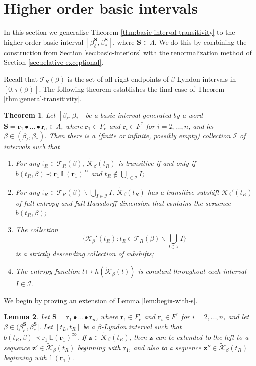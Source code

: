 \documentclass[11pt]{amsart}
\newtheorem{theorem}{Theorem}[section]
\newtheorem{lemma}[theorem]{Lemma}
\theoremstyle{definition}
\theoremstyle{remark}
\numberwithin{equation}{section}
\renewcommand{\L}{\ensuremath{\mathbb{L}}}
\newcommand{\II}{\mathcal{I}}
\newcommand{\Kt}{\widetilde{\mathcal{K}}}
\newcommand{\cs}{ {\mathbf{S}}}
\renewcommand{\r}{ {\mathbf{r}}}
\newcommand{\z}{\mathbf{z}}
\newcommand{\f}{\infty}
\newcommand{\La}{\Lambda}
\begin{document}
\section{Higher order basic intervals} \label{sec:higher-order-basic}

In this section we generalize Theorem \ref{thm:basic-interval-transitivity} to the higher order basic interval $[\beta_\ell^{\cs},\beta_*^{\cs}]$, where $\cs\in\La$. We do this by combining the construction from Section \ref{sec:basic-interiors} with the renormalization method of Section \ref{sec:relative-exceptional}.

Recall that $\mathcal{T}_R(\beta)$ is the set of all right endpoints of $\beta$-Lyndon intervals in $[0,\tau(\beta)]$. The following theorem establishes the final case of Theorem \ref{thm:general-transitivity}.

\begin{theorem} \label{thm:general-basic-intervals}
Let $[\beta_\ell,\beta_*]$ be a basic interval generated by a word $\cs=\r_1\bullet\dots\bullet \r_n\in\La$, where {$\r_1\in F_e$ and $\r_i\in F^*$ for $i=2,\dots,n$}, and let $\beta\in(\beta_\ell,\beta_*)$. Then there is a (finite or infinite, possibly empty) collection $\II$ of intervals such that
\begin{enumerate}[{\rm(i)}]
\item For any $t_R\in\mathcal{T}_R(\beta)$, $\Kt_\beta(t_R)$ is transitive if and only if $b(t_R,\beta)\prec \r_1^-\L(\r_1)^\f$ and $t_R\not\in\bigcup_{I\in\II}I$;
\item For any $t_R\in\mathcal{T}_R(\beta)\backslash \bigcup_{I\in\II}I$, $\Kt_\beta(t_R)$ has a transitive subshift $\mathcal{K}_\beta'(t_R)$ of full entropy and full Hausdorff dimension that contains the sequence $b(t_R,\beta)$;
\item The collection
\[
\{\mathcal{K}_\beta'(t_R): t_R\in\mathcal{T}_R(\beta)\backslash \textstyle{\bigcup_{I\in\II}I}\}
\]
is a strictly descending collection of subshifts;
\item The entropy function $t\mapsto h(\Kt_\beta(t))$ is constant throughout each interval $I\in\II$.
\end{enumerate}
\end{theorem}

We begin by proving an extension of Lemma \ref{lem:begin-with-s}.

\begin{lemma} \label{lem:weaker-left-extension}
Let $\cs=\r_1\bullet\dots\bullet \r_n$, where {$\r_1\in F_e$ and $\r_i\in F^*$ for $i=2,\dots,n$}, and let $\beta\in(\beta_\ell^{\cs},\beta_*^{\cs}]$. Let $[t_L,t_R]$ be a $\beta$-Lyndon interval such that $b(t_R,\beta)\prec \r_1^-\L(\r_1)^\f$. If $\z\in\Kt_\beta(t_R)$, then $\z$ can be extended to the left to a sequence $\z'\in \Kt_{\beta}(t_R)$ beginning with $\r_1$, and also to a sequence $\z''\in \Kt_{\beta}(t_R)$ beginning with $\L(\r_1)$.
\end{lemma}
\end{document}
